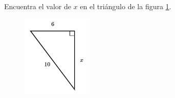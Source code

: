 \question[15]  Encuentra el valor de $x$ en el triángulo de la figura \ref{fig:lados_pitagoras_22}.
\begin{figure}[H]
    \begin{center}
        \includegraphics[width=0.3\textwidth]{../images/lados_pitagoras_22.png}
    \end{center}
    \caption{}
    \label{fig:lados_pitagoras_22}
\end{figure}
